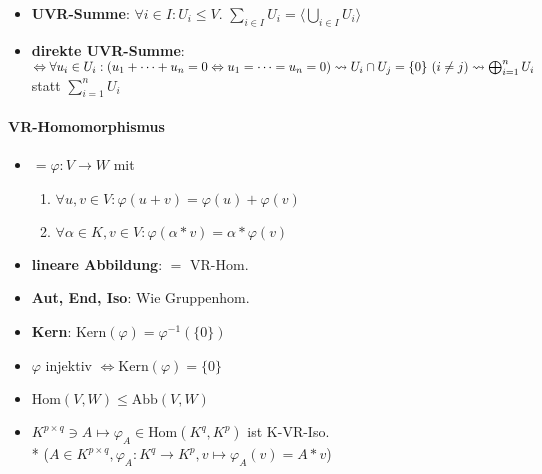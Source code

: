 \begin{itemize}
	\item \textbf{UVR-Summe}: $\forall i \in I: U_i \leq V$. $\sum_{i \in I} U_i = \langle \bigcup_{i \in I} U_i \rangle$
	\item \textbf{direkte UVR-Summe}: $\Leftrightarrow \forall u_i \in U_i : \\* (u_1 + \cdots + u_n = 0 \Leftrightarrow u_1 = \cdots = u_n = 0) \\* \leadsto U_i \cap U_j = \{ 0 \} \ (i \neq j) \\* \leadsto \bigoplus_{i=1}^n U_i$ statt $\sum_{i=1}^n U_i$
\end{itemize}

\paragraph{VR-Homomorphismus}
\begin{itemize}
	\item $= \varphi: V \rightarrow W$ mit
	\begin{enumerate}
		\item $\forall u,v \in V: \varphi(u+v) = \varphi(u)+\varphi(v)$
		\item $\forall \alpha \in K, v \in V: \varphi(\alpha*v)=\alpha*\varphi(v)$
	\end{enumerate}
	\item \textbf{lineare Abbildung}: $=$ VR-Hom.
	\item \textbf{Aut, End, Iso}: Wie Gruppenhom.
	\item \textbf{Kern}: $\text{Kern}(\varphi)=\varphi^{-1}(\{ 0 \})$
	\item $\varphi$ injektiv $\Leftrightarrow \text{Kern}(\varphi) = \{ 0 \}$
	\item $\text{Hom}(V,W) \leq \text{Abb}(V,W)$
	\item $K^{p \times q} \ni A \mapsto \varphi_A \in \text{Hom}(K^q, K^p)$ ist K-VR-Iso. \\* ($A \in K^{p \times q}, \varphi_A: K^q \rightarrow K^p, v \mapsto \varphi_A(v)=A*v $)
\end{itemize}

